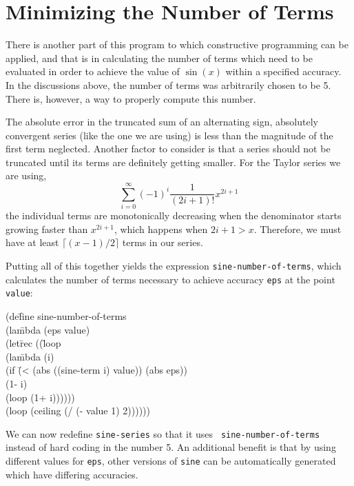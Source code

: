 \section{Minimizing the Number of Terms}

	There is another part of this program to which constructive
programming can be applied, and that is in calculating the number of
terms which need to be evaluated in order to achieve the value of
$\sin(x)$ within a specified accuracy.  In the discussions above, the
number of terms was arbitrarily chosen to be 5.  There is, however, a
way to properly compute this number.

	The absolute error in the truncated sum of an alternating sign,
absolutely convergent series (like the one we are using) is less than
the magnitude of the first term neglected.  Another factor to consider
is that a series should not be truncated until its terms are definitely
getting smaller. For the Taylor series we are using,
\[\sum_{i=0}^{\infty} (-1)^{i} \frac{1}{(2i+1)!} x^{2i+1} \]
the individual terms are monotonically decreasing when the 
denominator starts growing faster
than $x^{2i+1}$, which happens when $2i+1>x$.  Therefore, we must have
at least $\lceil(x-1)/2 \rceil$ terms in our series.

	Putting all of this together yields the expression 
{\tt sine-number-of-terms}, which calculates the number of terms
necessary to achieve accuracy {\tt eps} at the point {\tt value}:

\pagebreak
\begin{tt}\begin{tabbing}
(de\=fine sine-number-of-terms\\
\>   (la\=mbda (eps value)\\
\>\>    (let\=rec ((\=loop\\
\>\>\>\>             (la\=mbda (i)\\
\>\>\>\>\>              (if \=(< (abs ((sine-term i) value)) (abs eps))\\
\>\>\>\>\>\>                 (1- i)\\
\>\>\>\>\>\>                 (loop (1+ i))))))\\
\>\>\>         (loop (ceiling (/ (- value 1) 2))))))
\end{tabbing}\end{tt}
We can now redefine {\tt sine-series} so that it uses {\tt
sine-number-of-terms} instead of hard coding in the number 5.
An additional benefit is that by using different values for {\tt eps}, 
other versions of {\tt sine} can be automatically 
generated which have differing accuracies.


